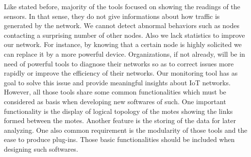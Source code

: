 Like stated before, majority of the tools focused on showing the readings of the sensors. In that sense, they do not give informations about how traffic is generated by the network. We cannot detect abnormal behaviors such as nodes contacting a surprising number of other nodes. Also we lack statistics to improve our network. For instance, by knowing that a certain node is highly solicited we can replace it by a more powerful device. Organizations, if not already, will be in need of powerful tools to diagnose their networks so as to correct issues more rapidly or improve the efficiency of their networks. Our monitoring tool has as goal to solve this issue and provide meaningful insights about IoT networks. \\

However, all those tools share some common functionalities which must be considered as basis when developing new softwares of such. One important functionality is the display of logical topology of the motes showing the links formed between the motes. Another feature is the storing of the data for later analyzing. One also common requirement is the modularity of those tools and the ease to produce plug-ins. Those basic functionalities should be included when designing such softwares.
